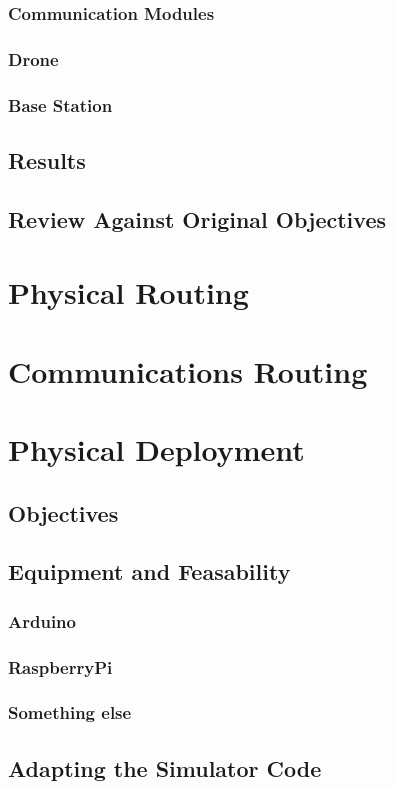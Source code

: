 \documentclass[12pt,a4paper,twoside]{report}
\begin{document}
		\subsection{Communication Modules}
		\subsection{Drone}
		\subsection{Base Station}
	\section{Results}
	\section{Review Against Original Objectives}

\chapter{Physical Routing}

\chapter{Communications Routing}

\chapter{Physical Deployment}
	\section{Objectives}
	\section{Equipment and Feasability}
		\subsection{Arduino}
		\subsection{RaspberryPi}
		\subsection{Something else}
	\section{Adapting the Simulator Code}
\end{document}
